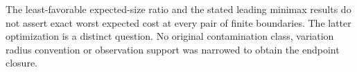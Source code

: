 The least-favorable expected-size ratio and the stated leading minimax
results do not assert exact worst expected cost at every pair of finite
boundaries. The latter optimization is a distinct question.
No original contamination class, variation radius convention or
observation support was narrowed to obtain the endpoint closure.
